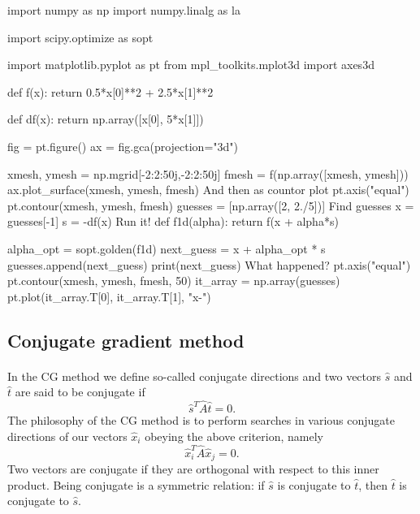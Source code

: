\documentclass[%
oneside,                 %
final,                   %
10pt]{article}
\begin{document}
\bpycod
import numpy as np
import numpy.linalg as la

import scipy.optimize as sopt

import matplotlib.pyplot as pt
from mpl_toolkits.mplot3d import axes3d

def f(x):
    return 0.5*x[0]**2 + 2.5*x[1]**2

def df(x):
    return np.array([x[0], 5*x[1]])

fig = pt.figure()
ax = fig.gca(projection="3d")

xmesh, ymesh = np.mgrid[-2:2:50j,-2:2:50j]
fmesh = f(np.array([xmesh, ymesh]))
ax.plot_surface(xmesh, ymesh, fmesh)
\epycod
And then as countor plot
\bpycod
pt.axis("equal")
pt.contour(xmesh, ymesh, fmesh)
guesses = [np.array([2, 2./5])]
\epycod
Find guesses
\bpycod
x = guesses[-1]
s = -df(x)
\epycod
Run it!
\bpycod
def f1d(alpha):
    return f(x + alpha*s)

alpha_opt = sopt.golden(f1d)
next_guess = x + alpha_opt * s
guesses.append(next_guess)
print(next_guess)
\epycod
What happened?
\bpycod
pt.axis("equal")
pt.contour(xmesh, ymesh, fmesh, 50)
it_array = np.array(guesses)
pt.plot(it_array.T[0], it_array.T[1], "x-")
\epycod

\subsection{Conjugate gradient method}

\paragraph{}
In the CG method we define so-called conjugate directions and two vectors 
$\hat{s}$ and $\hat{t}$
are said to be
conjugate if
\begin{equation*}
\hat{s}^T\hat{A}\hat{t}= 0.
\end{equation*}
The philosophy of the CG method is to perform searches in various conjugate directions
of our vectors $\hat{x}_i$ obeying the above criterion, namely
\begin{equation*}
\hat{x}_i^T\hat{A}\hat{x}_j= 0.
\end{equation*}
Two vectors are conjugate if they are orthogonal with respect to 
this inner product. Being conjugate is a symmetric relation: if $\hat{s}$ is conjugate to $\hat{t}$, then $\hat{t}$ is conjugate to $\hat{s}$.



\end{document}
